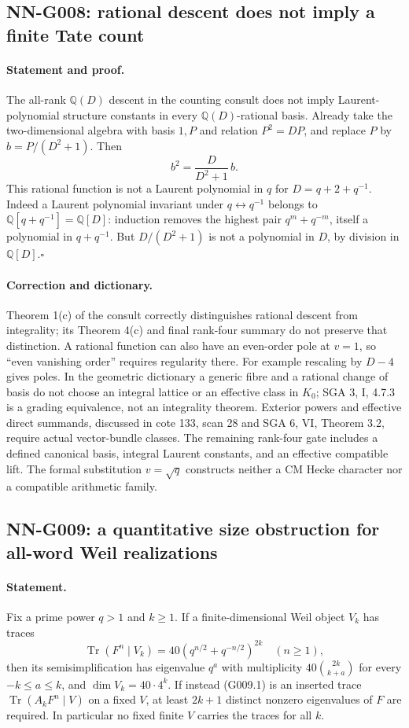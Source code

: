 \subsection{NN-G008: rational descent does not imply a finite Tate count}
\paragraph{Statement and proof.}
The all-rank $\mathbb Q(D)$ descent in the counting consult does
not imply Laurent-polynomial structure constants in every
$\mathbb Q(D)$-rational basis. Already take the two-dimensional
algebra with basis $1,P$ and relation $P^2=DP$, and replace
$P$ by $b=P/(D^2+1)$. Then
\[
 b^2=\frac{D}{D^2+1}\,b.                            \tag{G008.1}
\]
This rational function is not a Laurent polynomial in $q$ for
$D=q+2+q^{-1}$. Indeed a Laurent polynomial invariant under
$q\leftrightarrow q^{-1}$ belongs to $\mathbb Q[q+q^{-1}]
=\mathbb Q[D]$: induction removes the highest pair
$q^m+q^{-m}$, itself a polynomial in $q+q^{-1}$. But
$D/(D^2+1)$ is not a polynomial in $D$, by division in
$\mathbb Q[D]$.\hfill$\square$

\paragraph{Correction and dictionary.}
Theorem 1(c) of the consult correctly distinguishes rational
descent from integrality; its Theorem 4(c) and final rank-four
summary do not preserve that distinction. A rational function
can also have an even-order pole at $v=1$, so ``even vanishing
order'' requires regularity there. For example rescaling by
$D-4$ gives poles. In the geometric dictionary a generic fibre
and a rational change of basis do not choose an integral lattice
or an effective class in $K_0$; SGA 3, I, 4.7.3 is a grading
equivalence, not an integrality theorem. Exterior powers and
effective direct summands, discussed in cote 133, scan 28 and
SGA 6, VI, Theorem 3.2, require actual vector-bundle classes.
The remaining rank-four gate includes a defined canonical basis,
integral Laurent constants, and an effective compatible lift.
The formal substitution $v=\sqrt q$ constructs neither a CM
Hecke character nor a compatible arithmetic family.

\subsection{NN-G009: a quantitative size obstruction for all-word Weil realizations}
\paragraph{Statement.}
Fix a prime power $q>1$ and $k\ge1$. If a finite-dimensional
Weil object $V_k$ has traces
\[
 \operatorname{Tr}(F^n\mid V_k)=
 40(q^{n/2}+q^{-n/2})^{2k}\quad(n\ge1),
 \tag{G009.1}
\]
then its semisimplification has eigenvalue $q^a$ with multiplicity
$40\binom{2k}{k+a}$ for every $-k\le a\le k$, and
$\dim V_k=40\cdot4^k$. If instead (G009.1) is an inserted trace
$\operatorname{Tr}(A_kF^n\mid V)$ on a fixed $V$, at least
$2k+1$ distinct nonzero eigenvalues of $F$ are required. In
particular no fixed finite $V$ carries the traces for all $k$.


